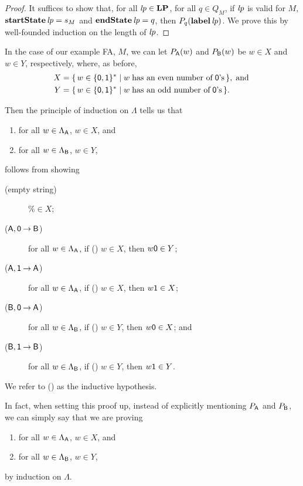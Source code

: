 \begin{proof}
It suffices to show that, for all ${\it lp}\in\mathbf{LP}$, for all $q\in Q_M$,
if ${\it lp}$ is valid for $M$, $\mathbf{startState}\,{\it lp} = s_M$ and
$\mathbf{endState}\,{\it lp} = q$, then $P_q(\mathbf{label}\,{\it lp})$.  We prove this by
well-founded induction on the length of ${\it lp}$.
\end{proof}

In the case of our example FA, $M$, we can let $P_{\mathsf{A}}(w)$ and $P_{\mathsf{B}}(w)$ be
$w\in X$ and $w\in Y$, respectively, where, as before,
\begin{align*}
X &= \{ \, w\in\{\mathsf{0,1}\}^* \mid w\;\allowbreak\mbox{has an even number of}\allowbreak\;
\mathsf{0}\allowbreak\mbox{'s}\allowbreak \, \} , \;\allowbreak\mbox{and}\allowbreak\;\\
Y &= \{ \, w\in\{\mathsf{0,1}\}^* \mid w\;\allowbreak\mbox{has an odd number of}\allowbreak\;
\mathsf{0}\allowbreak\mbox{'s}\allowbreak \, \} .
\end{align*}

Then the principle of induction on $\Lambda$ tells us that
\begin{enumerate}[\quad(A)]
\item for all $w\in\Lambda_{\mathsf{A}}$, $w\in X$, and

\item for all $w\in\Lambda_{\mathsf{B}}$, $w\in Y$,
\end{enumerate}
follows from showing
\begin{description}
\item[\quad(empty string)] $\%\in X$;

\item[\quad($\mathsf{A}, \mathsf{0}\mathbin{\to}\mathsf{B}$)] for all $w\in\Lambda_{\mathsf{A}}$, if
  (\dag) $w\in X$, then $w\mathsf{0}\in Y$;

\item[\quad($\mathsf{A}, \mathsf{1}\mathbin{\to}\mathsf{A}$)] for all $w\in\Lambda_{\mathsf{A}}$, if
  (\dag) $w\in X$, then $w\mathsf{1}\in X$;

\item[\quad($\mathsf{B}, \mathsf{0}\mathbin{\to}\mathsf{A}$)] for all $w\in\Lambda_{\mathsf{B}}$, if
  (\dag) $w\in Y$, then $w\mathsf{0}\in X$; and

\item[\quad($\mathsf{B}, \mathsf{1}\mathbin{\to}\mathsf{B}$)] for all $w\in\Lambda_{\mathsf{B}}$, if
  (\dag) $w\in Y$, then $w\mathsf{1}\in Y$.
\end{description}
We refer to (\dag) as the inductive hypothesis.

In fact, when setting this proof up, instead of explicitly mentioning
$P_{\mathsf{A}}$ and $P_{\mathsf{B}}$, we can simply say that we are proving
\begin{enumerate}[\quad(A)]
\item for all $w\in\Lambda_{\mathsf{A}}$, $w\in X$, and

\item for all $w\in\Lambda_{\mathsf{B}}$, $w\in Y$,
\end{enumerate}
by induction on $\Lambda$.

